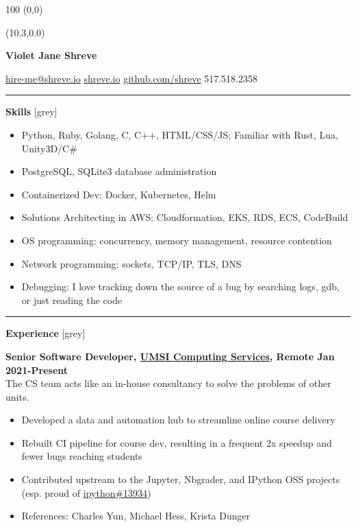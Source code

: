 \documentclass[10pt]{article}
\newcommand{\invisible}[1]{
  \begin{textblock}{100} (0,0)
    \textcolor{white}{#1}
  \end{textblock}
}
\newcommand \fullname {Violet Jane Shreve}
\newcommand \user {shreve}
\newcommand \phone {517.518.2358}
\newcommand{\sectiontitle}[1]{
  {\color{grey}\rule[0.15cm]{0.5cm}{0.5pt}}
  {\Large\textbf{#1}}
  \xrfill[0.1cm]{0.5pt}[grey]
}
\newcommand{\itempad}{\vspace{0.1in}}
\begin{document}
  \invisible{https://shreve.io}

  \begin{textblock}{0}(10.3,0.0)
  \end{textblock}

  \textbf{\Huge \fullname}

  \vspace{0.15in}
  {\Large \href{mailto:hire-me@shreve.io}{hire-me@\user.io} \hfill
  \href{https://shreve.io}{\user.io} \hfill
  \href{https://github.com/shreve}{github.com/\user} \hfill
  \phone}\\
  \vspace{0.05in}

  \sectiontitle{Skills}

  \begin{itemize}[leftmargin=1em]
    \setlength\itemsep{-0.3em}
    \item{Python, Ruby, Golang, C, C++, HTML/CSS/JS; Familiar with Rust, Lua, Unity3D/C\#}
    \item{PostgreSQL, SQLite3 database administration}
    \item{Containerized Dev: Docker, Kubernetes, Helm}
    \item{Solutions Architecting in AWS: Cloudformation, EKS, RDS, ECS, CodeBuild}
    \item{OS programming: concurrency, memory management, resource contention}
    \item{Network programming: sockets, TCP/IP, TLS, DNS}
    \item{Debugging: I love tracking down the source of a bug by searching logs, gdb, or just reading the code}
  \end{itemize}
  \itempad

  \sectiontitle{Experience}
  \itempad

  \textbf{Senior Software Developer, \href{https://www.si.umich.edu}{UMSI Computing Services}, Remote \hfill Jan 2021-Present}\\
  The CS team acts like an in-house consultancy to solve the problems of other units.
  \vspace{-0.07in}
  \begin{itemize}[leftmargin=1em]
    \setlength\itemsep{-0.3em}
    \item Developed a data and automation hub to streamline online course delivery
    \item Rebuilt CI pipeline for course dev, resulting in a frequent 2x speedup and fewer bugs reaching students
    \item Contributed upstream to the Jupyter, Nbgrader, and IPython OSS projects (esp. proud of \href{https://github.com/ipython/ipython/pull/13934}{ipython\#13934})
    \item References: Charles Yun, Michael Hess, Krista Dunger
  \end{itemize}
\end{document}
